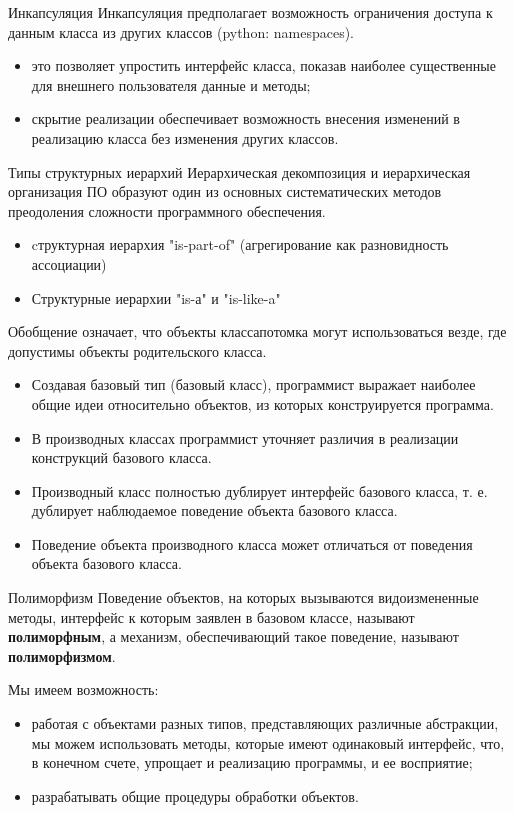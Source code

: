 \documentclass{beamer}
\begin{document}
\begin{frame}{Инкапсуляция}
Инкапсуляция предполагает возможность ограничения доступа к данным класса из других классов (python: namespaces). 
\begin{itemize}
\item это позволяет упростить интерфейс класса, показав наиболее существенные для внешнего пользователя данные и методы;
\item скрытие реализации обеспечивает возможность внесения изменений в реализацию класса без изменения других классов.
\end{itemize}
\end{frame}

\begin{frame}{Типы структурных иерархий}
Иерархическая декомпозиция и иерархическая организация ПО образуют один из основных систематических методов преодоления сложности программного обеспечения.
\begin{itemize}
\item cтруктурная иерархия "is-part-of" (агрегирование как разновидность ассоциации)
\item Структурные иерархии "is-а" и "is-like-a"
\end{itemize}
\end{frame}

\begin{frame}
\begin{block}{Обобщение}
означает, что объекты классапотомка могут использоваться везде, где допустимы объекты родительского класса. 
\end{block}
\begin{itemize}
\item Создавая базовый тип (базовый класс), программист выражает наиболее общие идеи относительно объектов, из которых конструируется программа.
\item В производных классах программист уточняет различия в реализации конструкций базового класса.
\item Производный класс полностью дублирует интерфейс базового класса, т. е. дублирует наблюдаемое поведение объекта базового класса. 
\item Поведение объекта производного класса может отличаться от поведения объекта базового класса.
\end{itemize}
\end{frame}

\begin{frame}{Полиморфизм}
Поведение объектов, на которых вызываются видоизмененные методы, интерфейс к которым заявлен в базовом классе, называют \textbf{полиморфным}, а механизм, обеспечивающий такое поведение, называют \textbf{полиморфизмом}.

Мы имеем возможность:
\begin{itemize}
\item работая с объектами разных типов, представляющих различные абстракции, мы можем использовать методы, которые имеют одинаковый интерфейс, что, в конечном счете, упрощает и реализацию программы, и ее восприятие;
\item разрабатывать общие процедуры обработки объектов.
\end{itemize}
\end{frame}
\end{document}
